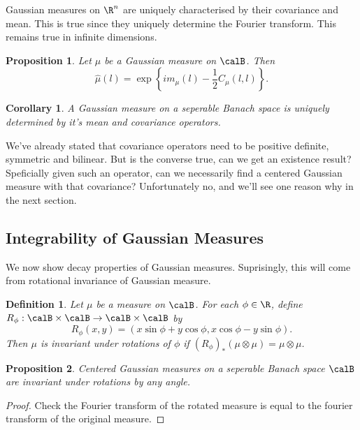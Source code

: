 \documentclass[fontsize=12pt, DIV=10]{scrreprt}
\theoremstyle{mydefn}
\newtheorem{defn}{Definition}
\newtheorem{prop}{Proposition}
\newtheorem{corollary}{Corollary}
\theoremstyle{remark}
\begin{document}
Gaussian measures on $\R^n$ are uniquely characterised by their covariance and mean. This is true since they uniquely determine the Fourier transform. This remains true in infinite dimensions.
\begin{prop}
	Let $\mu$ be a Gaussian measure on $\calB$. Then
	\begin{equation}
		\hat{\mu}(l) = \exp\left\{i m_{\mu}(l) - \frac{1}{2} C_{\mu}(l, l) \right\}.
	\end{equation}
\end{prop}
\begin{corollary}
	A Gaussian measure on a seperable Banach space is uniquely determined by it's mean and covariance operators.
\end{corollary}
We've already stated that covariance operators need to be positive definite, symmetric and bilinear. But is the converse true, can we get an existence result? Speficially given such an operator, can we necessarily find a centered Gaussian measure with that covariance? Unfortunately no, and we'll see one reason why in the next section.

\subsection{Integrability of Gaussian Measures}

We now show decay properties of Gaussian measures. Suprisingly, this will come from rotational invariance of Gaussian measure. 

\begin{defn}
	Let $\mu$ be a measure on $\calB$. For each $\phi \in \R$, define $R_{\phi}: \calB \times \calB \to \calB \times \calB$ by
	\begin{equation}
		R_{\phi}(x, y) = (x \sin \phi + y \cos \phi, x \cos \phi - y \sin \phi).
	\end{equation}
	Then $\mu$ is \emph{invariant under rotations of $\phi$} if $(R_{\phi})_* (\mu \otimes \mu) = \mu \otimes \mu$.
\end{defn}

\begin{prop}
	Centered Gaussian measures on a seperable Banach space $\calB$ are invariant under rotations by any angle.
\end{prop}
\begin{proof}
	Check the Fourier transform of the rotated measure is equal to the fourier transform of the original measure.
\end{proof}
\end{document}
